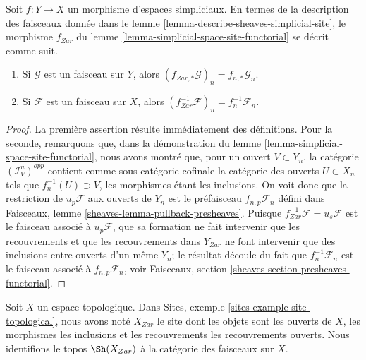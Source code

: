 \begin{lemma}
\label{lemma-describe-functoriality}
Soit $f : Y \to X$ un morphisme d'espaces simpliciaux. En termes de la
description des faisceaux donnée dans le
lemme \ref{lemma-describe-sheaves-simplicial-site}, le
morphisme $f_{Zar}$ du lemme \ref{lemma-simplicial-space-site-functorial}
se décrit comme suit.
\begin{enumerate}
\item Si $\mathcal{G}$ est un faisceau sur $Y$, alors
$(f_{Zar, *}\mathcal{G})_n = f_{n, *}\mathcal{G}_n$.
\item Si $\mathcal{F}$ est un faisceau sur $X$, alors
$(f_{Zar}^{-1}\mathcal{F})_n = f_n^{-1}\mathcal{F}_n$.
\end{enumerate}
\end{lemma}

\begin{proof}
La première assertion résulte immédiatement des définitions. Pour la seconde,
remarquons que, dans la démonstration du
lemme \ref{lemma-simplicial-space-site-functorial},
nous avons montré que, pour un ouvert $V \subset Y_n$, la catégorie
$(\mathcal{I}_V^u)^{opp}$ contient comme sous-catégorie cofinale
la catégorie des ouverts $U \subset X_n$ tels que $f_n^{-1}(U) \supset V$,
les morphismes étant les inclusions. On voit donc que la restriction
de $u_p\mathcal{F}$ aux ouverts de $Y_n$ est le préfaisceau
$f_{n, p}\mathcal{F}_n$ défini dans
Faisceaux, lemme \ref{sheaves-lemma-pullback-presheaves}.
Puisque $f_{Zar}^{-1}\mathcal{F} = u_s\mathcal{F}$ est le faisceau associé à
$u_p\mathcal{F}$, que sa formation ne fait intervenir que les recouvrements et
que les recouvrements dans $Y_{Zar}$ ne font intervenir que des inclusions
entre ouverts d'un même $Y_n$; le résultat découle du fait que $f_n^{-1}\mathcal{F}_n$
est le faisceau associé à $f_{n, p}\mathcal{F}_n$, voir
Faisceaux, section \ref{sheaves-section-presheaves-functorial}.
\end{proof}

\noindent
Soit $X$ un espace topologique. Dans
Sites, exemple \ref{sites-example-site-topological},
nous avons noté $X_{Zar}$ le site dont les objets sont les ouverts de $X$,
les morphismes les inclusions et les recouvrements les recouvrements ouverts.
Nous identifions le topos $\Sh(X_{Zar})$ à la catégorie
des faisceaux sur $X$.

